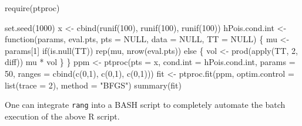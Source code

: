 \documentclass[
  10pt,
  letterpaper,
]{article}
\newenvironment{Shaded}{\begin{snugshade}}{\end{snugshade}}
\newcommand{\AttributeTok}[1]{\textcolor[rgb]{0.40,0.45,0.13}{#1}}
\newcommand{\ConstantTok}[1]{\textcolor[rgb]{0.56,0.35,0.01}{#1}}
\newcommand{\ControlFlowTok}[1]{\textcolor[rgb]{0.00,0.23,0.31}{#1}}
\newcommand{\DecValTok}[1]{\textcolor[rgb]{0.68,0.00,0.00}{#1}}
\newcommand{\FunctionTok}[1]{\textcolor[rgb]{0.28,0.35,0.67}{#1}}
\newcommand{\NormalTok}[1]{\textcolor[rgb]{0.00,0.23,0.31}{#1}}
\newcommand{\OtherTok}[1]{\textcolor[rgb]{0.00,0.23,0.31}{#1}}
\newcommand{\SpecialCharTok}[1]{\textcolor[rgb]{0.37,0.37,0.37}{#1}}
\newcommand{\StringTok}[1]{\textcolor[rgb]{0.13,0.47,0.30}{#1}}
\begin{document}
\begin{Shaded}
\begin{Highlighting}[]
\FunctionTok{require}\NormalTok{(ptproc)}

\FunctionTok{set.seed}\NormalTok{(}\DecValTok{1000}\NormalTok{)}
\NormalTok{x }\OtherTok{\textless{}{-}} \FunctionTok{cbind}\NormalTok{(}\FunctionTok{runif}\NormalTok{(}\DecValTok{100}\NormalTok{), }\FunctionTok{runif}\NormalTok{(}\DecValTok{100}\NormalTok{), }\FunctionTok{runif}\NormalTok{(}\DecValTok{100}\NormalTok{))}
\NormalTok{hPois.cond.int }\OtherTok{\textless{}{-}} \ControlFlowTok{function}\NormalTok{(params, eval.pts, }\AttributeTok{pts =} \ConstantTok{NULL}\NormalTok{,}
                           \AttributeTok{data =} \ConstantTok{NULL}\NormalTok{, }\AttributeTok{TT =} \ConstantTok{NULL}\NormalTok{) \{}
\NormalTok{    mu }\OtherTok{\textless{}{-}}\NormalTok{ params[}\DecValTok{1}\NormalTok{]}
    \ControlFlowTok{if}\NormalTok{(}\FunctionTok{is.null}\NormalTok{(TT))}
        \FunctionTok{rep}\NormalTok{(mu, }\FunctionTok{nrow}\NormalTok{(eval.pts))}
    \ControlFlowTok{else}\NormalTok{ \{}
\NormalTok{        vol }\OtherTok{\textless{}{-}} \FunctionTok{prod}\NormalTok{(}\FunctionTok{apply}\NormalTok{(TT, }\DecValTok{2}\NormalTok{, diff))}
\NormalTok{        mu }\SpecialCharTok{*}\NormalTok{ vol}
\NormalTok{    \}}
\NormalTok{\}}
\NormalTok{ppm }\OtherTok{\textless{}{-}} \FunctionTok{ptproc}\NormalTok{(}\AttributeTok{pts =}\NormalTok{ x, }\AttributeTok{cond.int =}\NormalTok{ hPois.cond.int, }\AttributeTok{params =} \DecValTok{50}\NormalTok{,}
              \AttributeTok{ranges =} \FunctionTok{cbind}\NormalTok{(}\FunctionTok{c}\NormalTok{(}\DecValTok{0}\NormalTok{,}\DecValTok{1}\NormalTok{), }\FunctionTok{c}\NormalTok{(}\DecValTok{0}\NormalTok{,}\DecValTok{1}\NormalTok{), }\FunctionTok{c}\NormalTok{(}\DecValTok{0}\NormalTok{,}\DecValTok{1}\NormalTok{)))}
\NormalTok{fit }\OtherTok{\textless{}{-}} \FunctionTok{ptproc.fit}\NormalTok{(ppm, }\AttributeTok{optim.control =} \FunctionTok{list}\NormalTok{(}\AttributeTok{trace =} \DecValTok{2}\NormalTok{), }\AttributeTok{method =} \StringTok{"BFGS"}\NormalTok{)}
\FunctionTok{summary}\NormalTok{(fit)}
\end{Highlighting}
\end{Shaded}

One can integrate \texttt{rang} into a BASH script to completely
automate the batch execution of the above R script.
\end{document}
